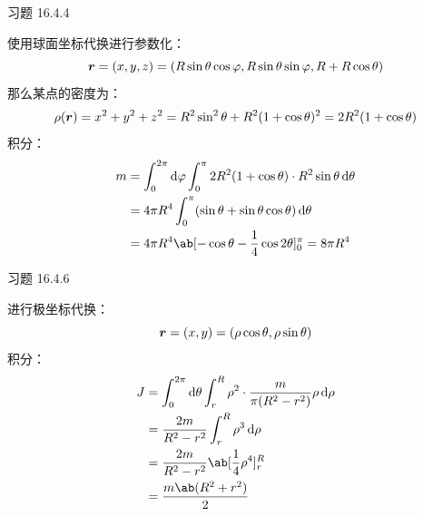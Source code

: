 \begin{problem}
	习题 16.4.4
	\begin{solution}
		使用球面坐标代换进行参数化：
		$$
		\boldsymbol{r} = (x, y, z) = (R \sin \theta \cos \varphi, R \sin \theta \sin \varphi, R + R \cos \theta)
		$$
		那么某点的密度为：
		$$
		\rho(\boldsymbol{r}) = x^2 + y^2 + z^2 = R^2 \sin^2 \theta + R^2 (1 + \cos \theta)^2 = 2 R^2 (1 + \cos \theta)
		$$
		积分：
		$$
		\begin{aligned}
			m & = \int_{0}^{2\pi} \dd{\varphi} \int_{0}^{\pi} 2 R^2 (1 + \cos \theta) \cdot R^2 \sin \theta \dd{\theta} \\
			& = 4 \pi R^4 \int_{0}^{\pi} (\sin \theta + \sin \theta \cos \theta) \dd{\theta} \\
			& = 4 \pi R^4 \ab[-\cos \theta - \frac{1}{4} \cos 2 \theta]_{0}^{\pi} = 8 \pi R^4
		\end{aligned}
		$$
	\end{solution}
\end{problem}

\begin{problem}
	习题 16.4.6
	\begin{solution}
		进行极坐标代换：
		$$
		\boldsymbol{r} = (x, y) = (\rho \cos \theta, \rho \sin \theta)
		$$
		积分：
		$$
		\begin{aligned}
			J & = \int_{0}^{2\pi} \dd{\theta} \int_{r}^{R} \rho^2 \cdot \frac{m}{\pi (R^2 - r^2)} \rho \dd{\rho} \\
			& = \frac{2 m}{R^2 - r^2} \int_{r}^{R} \rho^3 \dd{\rho} \\
			& = \frac{2 m}{R^2 - r^2} \ab[\frac{1}{4} \rho^4]_{r}^{R} \\
			& = \frac{m \ab(R^2 + r^2)}{2}
		\end{aligned}
		$$
	\end{solution}
\end{problem}

